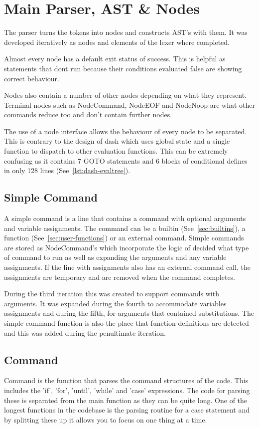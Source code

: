 \section{Main Parser, AST \& Nodes}
The parser turns the tokens into nodes and constructs AST's with them.
It was developed iteratively as nodes and elements of the lexer where completed. 

Almost every node has a default exit status of success.
This is helpful as statements that dont run because their conditions evaluated false are showing correct behaviour.

Nodes also contain a number of other nodes depending on what they represent.
Terminal nodes such as NodeCommand, NodeEOF and NodeNoop are what other commands reduce too and don't contain further nodes.

The use of a node interface allows the behaviour of every node to be separated.
This is contrary to the design of dash which uses global state and a single function to dispatch to other evaluation functions.
This can be extremely confusing as it contains 7 GOTO statements and 6 blocks of conditional defines in only 128 lines (See~\ref{lst:dash-evaltree}).


\subsection{Simple Command}
A simple command is a line that contains a command with optional arguments and variable assignments.
The command can be a builtin (See~\ref{sec:builtins}), a function (See~\ref{sec:user-functions}) or an external command.
Simple commands are stored as NodeCommand's which incorporate the logic of decided what type of command to run as well as expanding the arguments and any variable assignments.
If the line with assignments also has an external command call, the assignments are temporary and are removed when the command completes.

During the third iteration this was created to support commands with arguments.
It was expanded during the fourth to accommodate variables assignments and during the fifth, for arguments that contained substitutions.
The simple command function is also the place that function definitions are detected and this was added during the penultimate iteration.

\subsection{Command}
Command is the function that parses the command structures of the code.
This includes the 'if', 'for', 'until', 'while' and 'case' expressions.
The code for parsing these is separated from the main function as they can be quite long.
One of the longest functions in the codebase is the parsing routine for a case statement and by splitting these up it allows you to focus on one thing at a time.

